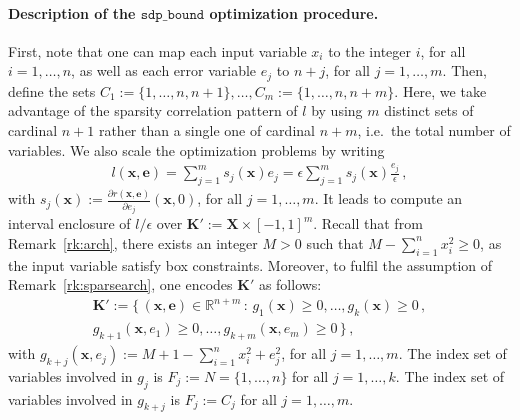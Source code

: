 \documentclass[preprint]{sigplanconf}
\newcommand{\R}{\mathbb{R}}
\newcommand{\x}{\mathbf{x}}
\newcommand{\e}{\mathbf{e}}
\def\K{\mathbf{K}}
\def\X{\mathbf{X}}
\newcommand{\sdpbound}{\mathtt{sdp\_bound}}
\theoremstyle{plain}
\begin{document}
\paragraph{Description of the $\sdpbound$ optimization procedure.}
First, note that one can map each input variable $x_i$ to the integer $i$, for all $i=1,\dots,n$, as well as each error variable $e_j$ to $n+j$, for all $j=1,\dots,m$. Then, define the sets $C_1 := \{1,\dots,n,n+1\}, \dots, C_m := \{1,\dots,n,n+m\}$. Here, we take advantage of the sparsity correlation pattern of $l$ by using $m$ distinct sets of cardinal $n+1$ rather than a single one of cardinal $n+m$, i.e.~the total number of variables. 
We also scale the optimization problems by writing 
\begin{align}
\label{eq:lscale}
l(\x,\e) = \sum_{j=1}^m s_j (\x) e_j = \epsilon \sum_{j=1}^m s_j (\x) \frac{e_j}{\epsilon} \,,
\end{align}
%
with $s_j(\x) := \frac{\partial r(\x,\e)} {\partial e_j} (\x,0)$, for all $j=1,\dots,m$. It leads to compute an interval enclosure of $l/\epsilon$ over $\K' := \X \times [-1, 1]^m$.
Recall that from Remark~\ref{rk:arch}, there exists an integer $M > 0$ such that $M - \sum_{i=1}^n x_i^2 \geq 0$, as the input variable satisfy box constraints.
Moreover, to fulfil the assumption of Remark~\ref{rk:sparsearch},  one encodes $\K'$ as follows: 
\begin{align*}
\K' := \{\, (\x,\e) \in \R^{n+m} \, : \, g_1 (\x) \geq 0, \dots, g_k(\x) \geq 0 \,, \\
g_{k+1}(\x,e_1) \geq 0, \dots, g_{k+m} (\x, e_m) \geq 0 \,\} \,,
\end{align*}
%
with $g_{k+j}(\x, e_j) := M + 1 -  \sum_{i=1}^n x_i^2 + e_j^2$, for all $j=1,\dots, m$. 
The index set of variables involved in $g_j$ is $F_j := N = \{1, \dots, n\}$ for all $j=1, \dots, k$. 
The index set of variables involved in $g_{k+j}$ is $F_j := C_j$ for all $j=1, \dots, m$. 
\end{document}
